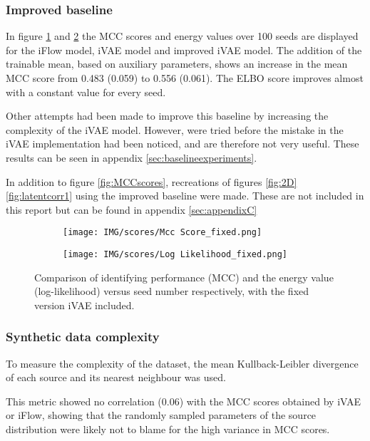 \subsubsection{Improved baseline}
\label{sec:alt methods}
In figure \ref{fig:MCCscores_Fixed:a} and \ref{fig:MCCscores_Fixed:b} the MCC scores and energy values over 100 seeds are displayed for the iFlow model, iVAE model and improved iVAE model. The addition of the trainable mean, based on auxiliary parameters, shows an increase in the mean MCC score from 0.483 (0.059) to 0.556 (0.061). The ELBO score improves almost with a constant value for every seed.

Other attempts had been made to improve this baseline by increasing the complexity of the iVAE model. However, were tried before the mistake in the iVAE implementation had been noticed, and are therefore not very useful. These results can be seen in appendix \ref{sec:baselineexperiments}.

In addition to figure \ref{fig:MCCscores}, recreations of figures \ref{fig:2D} \ref{fig:latentcorr1} using the improved baseline were made. These are not included in this report but can be found in appendix \ref{sec:appendixC}

\begin{figure}[htb] 
  \begin{subfigure}[b]{0.5\linewidth}
    \centering
    \texttt{[image: IMG/scores/Mcc Score\_fixed.png]}
    \caption{} 
    \label{fig:MCCscores_Fixed:a} 
  \end{subfigure}%
  \begin{subfigure}[b]{0.5\linewidth}
    \centering
    \texttt{[image: IMG/scores/Log Likelihood\_fixed.png]} 
    \caption{} 
    \label{fig:MCCscores_Fixed:b} 
  \end{subfigure} 
  \caption{Comparison of identifying performance (MCC) and the energy value (log-likelihood) versus seed number respectively, with the fixed version iVAE included.}
  \label{fig:MCCscores_Fixed}
\end{figure}

\subsubsection{Synthetic data complexity}
To measure the complexity of the dataset, the mean Kullback-Leibler divergence \cite{kullback1951information} of each source and its nearest neighbour was used.

This metric showed no correlation (0.06) with the MCC scores obtained by iVAE or iFlow, showing that the randomly sampled parameters of the source distribution were likely not to blame for the high variance in MCC scores. 

